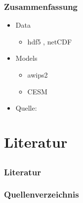 \documentclass[compress]{beamer}
\begin{document}
\begin{frame}
	\frametitle{Zusammenfassung}

	\begin{itemize}
		\item Data

		\begin{itemize}
			\item hdf5 , netCDF
		\end{itemize}

		\item Models
		\begin{itemize}
			\item awips2
			\item CESM
		\end{itemize}

		\item Quelle: \cite{Quelle2012}

	\end{itemize}
\end{frame}

\section{Literatur}
\subsection*{}

\begin{frame}
	\frametitle{Literatur}
    \frametitle{Quellenverzeichnis}

	
	
\end{frame}
\end{document}
